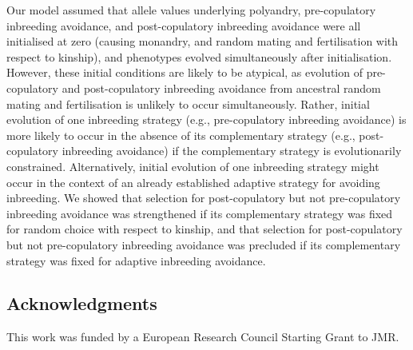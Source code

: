\documentclass[10pt,letterpaper]{article}
\begin{document}
Our model assumed that allele values underlying polyandry, pre-copulatory inbreeding avoidance, and post-copulatory inbreeding avoidance were all initialised at zero (causing monandry, and random mating and fertilisation with respect to kinship), and phenotypes evolved simultaneously after initialisation. However, these initial conditions are likely to be atypical, as evolution of pre-copulatory and post-copulatory inbreeding avoidance from ancestral random mating and fertilisation is unlikely to occur simultaneously. Rather, initial evolution of one inbreeding strategy (e.g., pre-copulatory inbreeding avoidance) is more likely to occur in the absence of its complementary strategy (e.g., post-copulatory inbreeding avoidance) if the complementary strategy is evolutionarily constrained. Alternatively, initial evolution of one inbreeding strategy might occur in the context of an already established adaptive strategy for avoiding inbreeding. We showed that selection for post-copulatory but not pre-copulatory inbreeding avoidance was strengthened if its complementary strategy was fixed for random choice with respect to kinship, and that selection for post-copulatory but not pre-copulatory inbreeding avoidance was precluded if its complementary strategy was fixed for adaptive inbreeding avoidance.


\subsection*{Acknowledgments}

This work was funded by a European Research Council Starting Grant to JMR. 

\begin{small}


\end{small}
\end{document}
